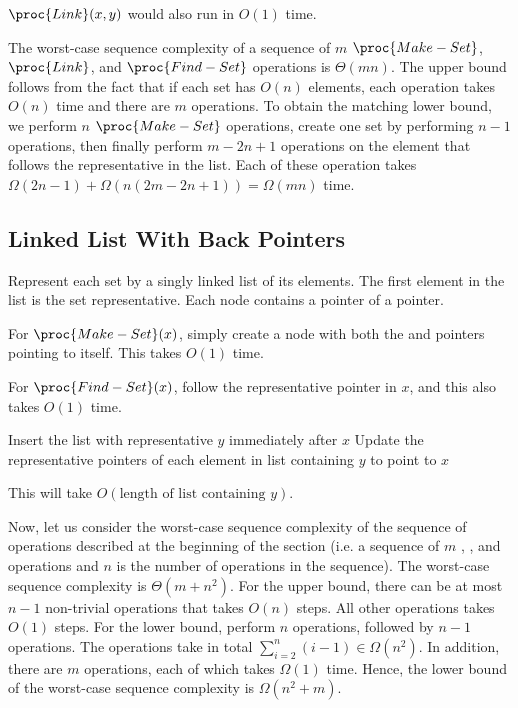 $\proc{Link}(x,y)$ would also run in $O(1)$ time.

The worst-case sequence complexity of a sequence of $m$ $\proc{Make-Set}$, $\proc{Link}$, and $\proc{Find-Set}$ operations is $\Theta(mn)$. The upper bound follows from the fact that if each set has $O(n)$ elements, each operation takes $O(n)$ time and there are $m$ operations. To obtain the matching lower bound, we perform $n$ $\proc{Make-Set}$ operations, create one set by performing $n-1$  operations, then finally perform $m-2n+1$  operations on the element that follows the representative in the list. Each of these operation takes $\Omega(2n-1)+\Omega(n(2m-2n+1)) = \Omega(mn)$ time.

\subsection{Linked List With Back Pointers}

Represent each set by a singly linked list of its elements. The first element in the list is the set representative. Each node contains a  pointer of a  pointer.

For $\proc{Make-Set}(x)$, simply create a node with both the  and  pointers pointing to itself. This takes $O(1)$ time.

For $\proc{Find-Set}(x)$, follow the representative pointer in $x$, and this also takes $O(1)$ time.

\begin{codebox}
    \zi Insert the list with representative $y$ immediately after $x$
    \zi Update the representative pointers of each element in list containing $y$ to point to $x$
\end{codebox}

This will take $O(\text{length of list containing $y$})$.

Now, let us consider the worst-case sequence complexity of the sequence of operations described at the beginning of the section (i.e. a sequence of $m$ , , and  operations and $n$ is the number of  operations in the sequence). The worst-case sequence complexity is $\Theta(m+n^2)$. For the upper bound, there can be at most $n-1$ non-trivial  operations that takes $O(n)$ steps. All other operations takes $O(1)$ steps. For the lower bound, perform $n$  operations, followed by $n-1$  operations. The  operations take in total $\sum_{i=2}^{n} (i-1) \in \Omega(n^2)$. In addition, there are $m$ operations, each of which takes $\Omega(1)$ time. Hence, the lower bound of the worst-case sequence complexity is $\Omega(n^2+m)$. 

